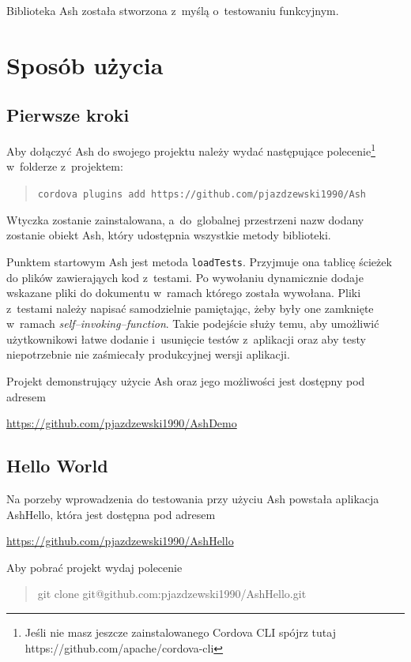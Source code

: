 \documentclass[brudnopis]{xmgr}
\begin{document}
Biblioteka Ash została stworzona z~myślą o~testowaniu funkcyjnym.

\chapter{Sposób użycia}
\section{Pierwsze kroki}

Aby dołączyć Ash do swojego projektu należy wydać następujące polecenie\footnote{Jeśli nie masz jeszcze zainstalowanego Cordova CLI spójrz tutaj https://github.com/apache/cordova-cli} w~folderze z~projektem:
\begin{quote}
   \texttt{cordova plugins add https://github.com/pjazdzewski1990/Ash}
\end{quote}

Wtyczka zostanie zainstalowana, a~do~globalnej przestrzeni nazw dodany zostanie obiekt Ash, który udostępnia wszystkie metody biblioteki.

Punktem startowym Ash jest metoda \texttt{loadTests}. Przyjmuje ona tablicę ścieżek do plików zawierająych kod z~testami. Po wywołaniu dynamicznie dodaje wskazane pliki do dokumentu w~ramach którego została wywołana. Pliki z~testami należy napisać samodzielnie pamiętając, żeby były one zamknięte w~ramach \textit{self--invoking--function}. Takie podejście służy temu, aby umożliwić użytkownikowi łatwe dodanie i~usunięcie testów z~aplikacji oraz aby testy niepotrzebnie nie zaśmiecały produkcyjnej wersji aplikacji.

Projekt demonstrujący użycie Ash oraz jego możliwości jest dostępny pod adresem

\url{https://github.com/pjazdzewski1990/AshDemo}

\section{Hello World}

Na porzeby wprowadzenia do testowania przy użyciu Ash powstała aplikacja AshHello, która jest dostępna pod adresem 

\url{https://github.com/pjazdzewski1990/AshHello}

Aby pobrać projekt wydaj polecenie

\begin{quote}
   git clone git@github.com:pjazdzewski1990/AshHello.git
\end{quote}
\end{document}
